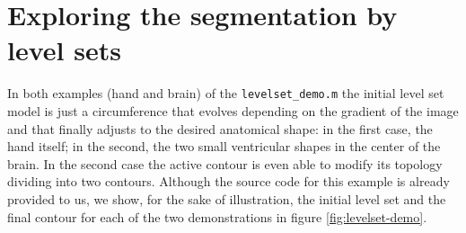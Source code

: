 \section{Exploring the segmentation by level sets}

In both examples (hand and brain) of the \texttt{levelset\_demo.m} the initial level set model is just a circumference that evolves depending on the gradient of the image and that finally adjusts to the desired anatomical shape: in the first case, the hand itself; in the second, the two small ventricular shapes in the center of the brain. In the second case the active contour is even able to modify its topology dividing into two contours. Although the source code for this example is already provided to us, we show, for the sake of illustration, the initial level set and the final contour for each of the two demonstrations in figure \ref{fig:levelset-demo}.


